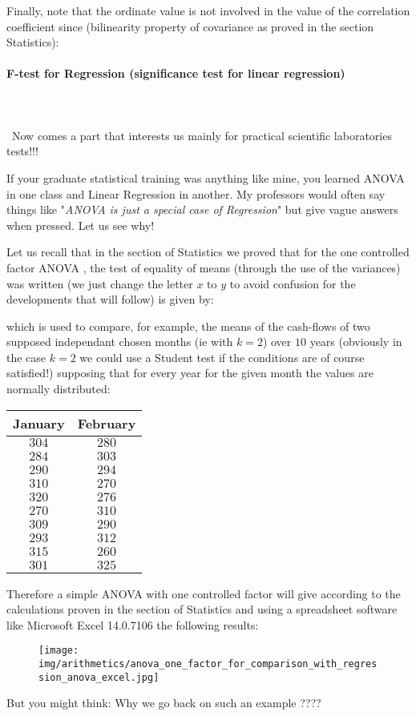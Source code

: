 	Finally, note that the ordinate value is not involved in the value of the correlation coefficient since (bilinearity property of covariance as proved in the section Statistics):
	
	
	\pagebreak
	\paragraph{F-test for Regression (significance test for linear regression)}\label{dummy variable regression}\label{anova for linear regression}\mbox{}\\\\\
	Now comes a part that interests us mainly for practical scientific laboratories tests!!! 
	
	If your graduate statistical training was anything like mine, you learned ANOVA in one class and Linear Regression in another. My professors would often say things like "\textit{ANOVA is just a special case of Regression}" but give vague answers when pressed. Let us see why!
	
	Let us recall that in the section of Statistics we proved that for the one controlled factor ANOVA , the test of equality of means (through the use of the variances) was written (we just change the letter $x$ to $y$ to avoid confusion for the developments that will follow) is given by:
	
	which is used to compare, for example, the means of the cash-flows of two supposed independant chosen months (ie with $k=2$) over $10$ years (obviously in the case $k=2$ we could use a Student test if the conditions are of course satisfied!) supposing that for every year for the given month the values are normally distributed:
	\begin{table}[H]
	\centering
			\begin{tabular}{|c|c|}
				\hline
				\cellcolor{black!30}\textbf{January} & \cellcolor{black!30}\textbf{February} \\ \hline
				$304$ & $280$ \\ \hline
				$284$ & $303$ \\ \hline
				$290$ & $294$ \\ \hline
				$310$ & $270$ \\ \hline
				$320$ & $276$ \\ \hline
				$270$ & $310$ \\ \hline
				$309$ & $290$ \\ \hline
				$293$ & $312$ \\ \hline
				$315$ & $260$ \\ \hline
				$301$ & $325$ \\ \hline
		\end{tabular}
	\end{table}
	Therefore a simple ANOVA with one controlled factor will give according to the calculations proven in the section of Statistics and using a spreadsheet software like Microsoft Excel 14.0.7106 the following results:
	\begin{figure}[H]
		\centering
		\texttt{[image: img/arithmetics/anova\_one\_factor\_for\_comparison\_with\_regression\_anova\_excel.jpg]}
	\end{figure}
	But you might think: Why we go back on such an example ????

